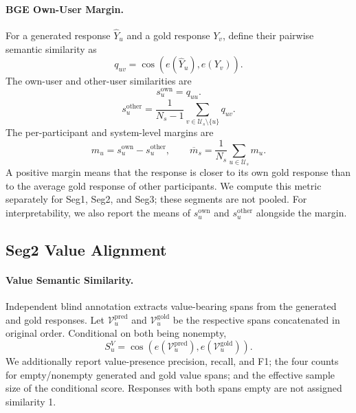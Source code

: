 \paragraph{BGE Own-User Margin.}
For a generated response $\hat Y_u$ and a gold response $Y_v$, define their pairwise semantic similarity as
\begin{equation}
q_{uv}=\cos(e(\hat Y_u),e(Y_v)).
\label{eq:bge_pairwise_similarity}
\end{equation}
The own-user and other-user similarities are
\begin{equation}
s_u^{\mathrm{own}}=q_{uu}.
\label{eq:bge_own_similarity}
\end{equation}
\begin{equation}
s_u^{\mathrm{other}}=
\frac{1}{N_s-1}\sum_{v\in\mathcal U_s\setminus\{u\}}q_{uv}.
\label{eq:bge_other_similarity}
\end{equation}
The per-participant and system-level margins are
\begin{equation}
m_u=s_u^{\mathrm{own}}-s_u^{\mathrm{other}},
\qquad
\overline m_s=\frac{1}{N_s}\sum_{u\in\mathcal U_s}m_u.
\label{eq:bge_margin}
\end{equation}
A positive margin means that the response is closer to its own gold response than to the average gold response of other participants. We compute this metric separately for Seg1, Seg2, and Seg3; these segments are not pooled.
For interpretability, we also report the means of $s_u^{\mathrm{own}}$ and $s_u^{\mathrm{other}}$ alongside the margin.

\subsection{Seg2 Value Alignment}

\paragraph{Value Semantic Similarity.}
Independent blind annotation extracts value-bearing spans from the generated and gold responses. Let $\mathcal V_u^{\mathrm{pred}}$ and $\mathcal V_u^{\mathrm{gold}}$ be the respective spans concatenated in original order. Conditional on both being nonempty,
\begin{equation}
S_u^V=\cos\left(e(\mathcal V_u^{\mathrm{pred}}),
e(\mathcal V_u^{\mathrm{gold}})\right).
\label{eq:value_semantic_similarity}
\end{equation}
We additionally report value-presence precision, recall, and F1; the four counts for empty/nonempty generated and gold value spans; and the effective sample size of the conditional score. Responses with both spans empty are not assigned similarity 1.


